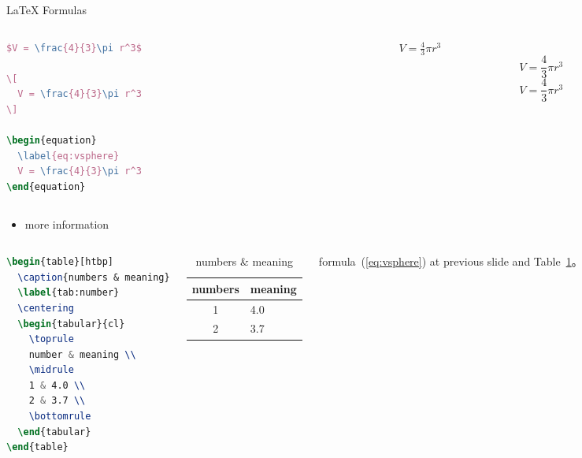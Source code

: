 \documentclass[UTF8]{ctexbeamer}
\begin{document}
\begin{frame}[fragile]{\LaTeX{} Formulas}
    \begin{columns}
        \begin{column}{.55\textwidth}
\begin{lstlisting}[language=TeX]
$V = \frac{4}{3}\pi r^3$

\[
  V = \frac{4}{3}\pi r^3
\]

\begin{equation}
  \label{eq:vsphere}
  V = \frac{4}{3}\pi r^3
\end{equation}
\end{lstlisting}
        \end{column}
        \begin{column}{.4\textwidth}
            $V = \frac{4}{3}\pi r^3$
            \[
                V = \frac{4}{3}\pi r^3
            \]
            \begin{equation}
                \label{eq:vsphere}
                V = \frac{4}{3}\pi r^3
            \end{equation}
        \end{column}
    \end{columns}
    \begin{itemize}
        \item more information \href{https://ja.overleaf.com/learn/latex/Mathematical_expressions}{\color{purple}{here}}
    \end{itemize}
\end{frame}

\begin{frame}[fragile]
    \begin{columns}
\begin{lstlisting}[language=TeX]
\begin{table}[htbp]
  \caption{numbers & meaning}
  \label{tab:number}
  \centering
  \begin{tabular}{cl}
    \toprule
    number & meaning \\
    \midrule
    1 & 4.0 \\
    2 & 3.7 \\
    \bottomrule
  \end{tabular}
\end{table}
\end{lstlisting}
        \begin{table}[htpb]
            \centering
            \caption{numbers \& meaning}
            \label{tab:number}
            \begin{tabular}{cl}\toprule
                numbers & meaning \\\midrule
                1 & 4.0\\
                2 & 3.7\\\bottomrule
            \end{tabular}
        \end{table}
        \normalsize formula~(\ref{eq:vsphere}) at previous slide and Table~\ref{tab:number}。
    \end{columns}
\end{frame}
\end{document}
